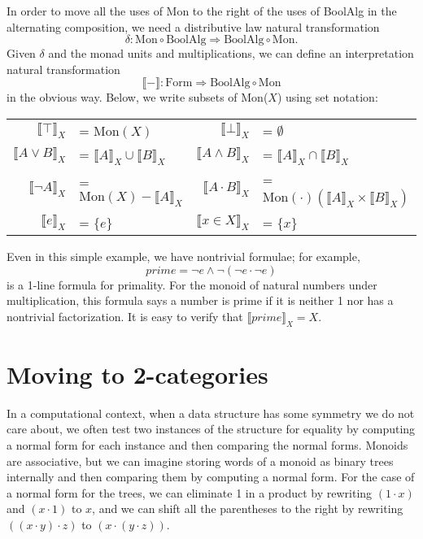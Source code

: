 \documentclass{llncs}
\newcommand{\interp}[1]{\llbracket #1 \rrbracket}
\newcommand{\maps}{\colon}
\newcommand{\Mon}{\mathrm{Mon}}
\newcommand{\BoolAlg}{\mathrm{BoolAlg}}
\renewcommand{\Form}{\mathrm{Form}}
\begin{document}
In order to move all the uses of Mon to the right of the uses of BoolAlg in the alternating composition, we need a distributive law natural transformation
\[ \delta\maps \Mon \circ \BoolAlg \Rightarrow \BoolAlg \circ \Mon. \]
Given $\delta$ and the monad units and multiplications, we can define an interpretation natural transformation
\[ \interp{-}\maps \Form\Rightarrow \BoolAlg \circ \Mon \]
in the obvious way.  Below, we write subsets of Mon($X$) using set notation:
\begin{center}
  \begin{longtable}{|rl|rl|}
    \hline
    $\interp{\top}_X$ &= $\Mon(X)$ &
    $\interp{\bot}_X$ &= $\emptyset$ \\
    $\interp{{A}\lor{B}}_X$ &= $\interp{A}_X \cup \interp{B}_X$ &
    $\interp{{A}\land{B}}_X$ &= $\interp{A}_X \cap \interp{B}_X$\\
    $\interp{\neg A}_X$ &= $\Mon(X) - \interp{A}_X$ &
    $\interp{{A} \cdot {B}}_X$ &= $\Mon(\cdot)(\interp{A}_X \times \interp{B}_X)$\\
    $\interp{e}_X$ &= $\{ e\}$ &
    $\interp{x \in X}_X$ &= $\{ x\}$\\
    \hline
  \end{longtable}
\end{center}

Even in this simple example, we have nontrivial formulae; for example,
\[ prime = \neg e \land \neg(\neg e \cdot \neg e) \]
is a 1-line formula for primality.  For the monoid of natural numbers under multiplication, this formula says a number is prime if it is neither 1 nor has a nontrivial factorization.  It is easy to verify that $\interp{prime}_X = X.$

\section{Moving to 2-categories}

In a computational context, when a data structure has some symmetry we do not care about, we often test two instances of the structure for equality by computing a normal form for each instance and then comparing the normal forms.  Monoids are associative, but we can imagine storing words of a monoid as binary trees internally and then comparing them by computing a normal form.  For the case of a normal form for the trees, we can eliminate 1 in a product by rewriting $(1 \cdot x)$ and $(x \cdot 1)$ to $x$, and we can shift all the parentheses to the right by rewriting $((x \cdot y) \cdot z)$ to $(x \cdot (y \cdot z)).$
\end{document}
